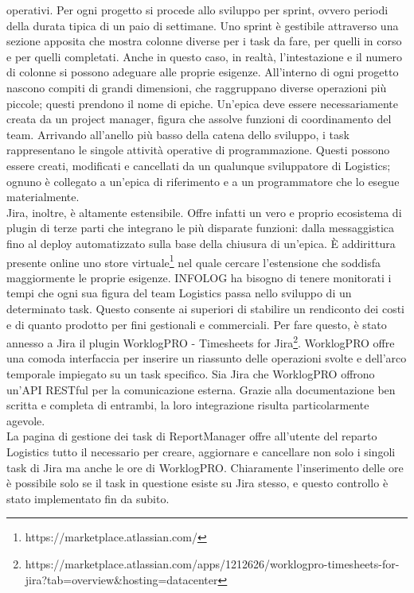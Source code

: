 operativi.
Per ogni progetto si procede allo sviluppo per sprint, ovvero periodi della durata tipica di un paio di settimane.
Uno sprint è gestibile attraverso una sezione apposita che mostra colonne diverse per i task da fare, per quelli in corso e per quelli completati.
Anche in questo caso, in realtà, l'intestazione e il numero di colonne si possono adeguare alle proprie esigenze.
All'interno di ogni progetto nascono compiti di grandi dimensioni, che raggruppano diverse operazioni più piccole; questi prendono il nome di epiche.
Un'epica deve essere necessariamente creata da un project manager, figura che assolve funzioni di coordinamento del team.
Arrivando all'anello più basso della catena dello sviluppo, i task rappresentano le singole attività operative di programmazione.
Questi possono essere creati, modificati e cancellati da un qualunque sviluppatore di Logistics; ognuno è collegato a un'epica di riferimento e a un programmatore che lo esegue
materialmente.
\\
Jira, inoltre, è altamente estensibile. Offre infatti un vero e proprio ecosistema di plugin di terze parti che integrano le più disparate funzioni: dalla messaggistica
fino al deploy automatizzato sulla base della chiusura di un'epica. È addirittura presente online uno store virtuale\footnote{https://marketplace.atlassian.com/} nel quale cercare
l'estensione che soddisfa maggiormente le proprie esigenze.
INFOLOG ha bisogno di tenere monitorati i tempi che ogni sua figura del team Logistics passa nello sviluppo di un determinato task.
Questo consente ai superiori di stabilire un rendiconto dei costi e di quanto prodotto per fini gestionali e commerciali.
Per fare questo, è stato annesso a Jira il plugin WorklogPRO - Timesheets for Jira\footnote{https://marketplace.atlassian.com/apps/1212626/worklogpro-timesheets-for-jira?tab=overview\&hosting=datacenter}.
WorklogPRO offre una comoda interfaccia per inserire un riassunto delle operazioni svolte e dell'arco temporale impiegato su un task specifico.
Sia Jira che WorklogPRO offrono un'API RESTful per la comunicazione esterna. Grazie alla documentazione ben scritta e completa di entrambi, la loro integrazione risulta
particolarmente agevole.
\\
La pagina di gestione dei task di ReportManager offre all'utente del reparto Logistics tutto il necessario per creare, aggiornare e cancellare non solo i singoli task di Jira ma
anche le ore di WorklogPRO.
Chiaramente l'inserimento delle ore è possibile solo se il task in questione esiste su Jira stesso, e questo controllo è stato implementato fin da subito.
